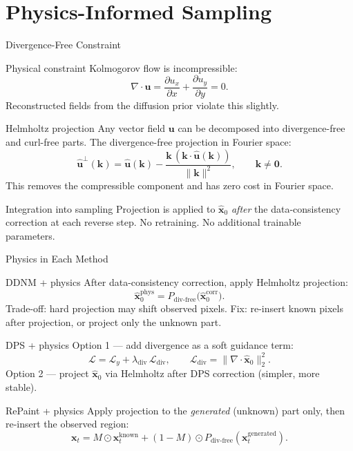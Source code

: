 \documentclass[9pt]{beamer}
\begin{document}
\section{Physics-Informed Sampling}

\begin{frame}{Divergence-Free Constraint}
\begin{block}{Physical constraint}
Kolmogorov flow is incompressible:
\[
  \nabla \cdot \mathbf{u} = \frac{\partial u_x}{\partial x} + \frac{\partial u_y}{\partial y} = 0.
\]
Reconstructed fields from the diffusion prior violate this slightly.
\end{block}
\begin{block}{Helmholtz projection}
Any vector field $\mathbf{u}$ can be decomposed into divergence-free and curl-free parts.
The divergence-free projection in Fourier space:
\[
  \hat{\mathbf{u}}^\perp(\mathbf{k}) = \hat{\mathbf{u}}(\mathbf{k}) - \frac{\mathbf{k}\,(\mathbf{k}\cdot\hat{\mathbf{u}}(\mathbf{k}))}{\|\mathbf{k}\|^2},
  \qquad \mathbf{k} \neq \mathbf{0}.
\]
This removes the compressible component and has zero cost in Fourier space.
\end{block}
\begin{block}{Integration into sampling}
Projection is applied to $\hat{\mathbf{x}}_0$ \emph{after} the data-consistency correction at each reverse step.
No retraining. No additional trainable parameters.
\end{block}
\end{frame}


\begin{frame}{Physics in Each Method}
\begin{block}{DDNM + physics}
After data-consistency correction, apply Helmholtz projection:
\[
  \hat{\mathbf{x}}_0^\text{phys} = P_{\text{div-free}}\bigl(\hat{\mathbf{x}}_0^\text{corr}\bigr).
\]
Trade-off: hard projection may shift observed pixels.
Fix: re-insert known pixels after projection, or project only the unknown part.
\end{block}
\begin{block}{DPS + physics}
Option 1 — add divergence as a soft guidance term:
\[
  \mathcal{L} = \mathcal{L}_y + \lambda_\text{div}\,\mathcal{L}_\text{div},
  \qquad \mathcal{L}_\text{div} = \|\nabla\cdot\hat{\mathbf{x}}_0\|_2^2.
\]
Option 2 — project $\hat{\mathbf{x}}_0$ via Helmholtz after DPS correction (simpler, more stable).
\end{block}
\begin{block}{RePaint + physics}
Apply projection to the \emph{generated} (unknown) part only, then re-insert the observed region:
\[
  \mathbf{x}_t = M\odot\mathbf{x}_t^\text{known}
    + (1-M)\odot P_{\text{div-free}}(\mathbf{x}_t^\text{generated}).
\]
\end{block}
\end{frame}
\end{document}
